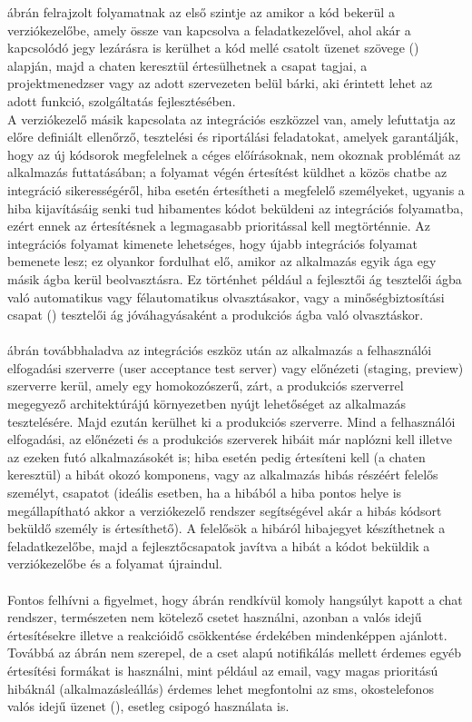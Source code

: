  ábrán felrajzolt folyamatnak az első szintje az amikor a kód bekerül a verziókezelőbe, amely össze van kapcsolva a feladatkezelővel, ahol akár a kapcsolódó jegy lezárásra is kerülhet a kód mellé csatolt üzenet szövege () alapján, majd a chaten keresztül értesülhetnek a csapat tagjai, a projektmenedzser vagy az adott szervezeten belül bárki, aki érintett lehet az adott funkció, szolgáltatás fejlesztésében.\\
A verziókezelő másik kapcsolata az integrációs eszközzel van, amely lefuttatja az előre definiált ellenőrző, tesztelési és riportálási feladatokat, amelyek garantálják, hogy az új kódsorok megfelelnek a céges előírásoknak, nem okoznak problémát az alkalmazás futtatásában; a folyamat végén értesítést küldhet a közös chatbe az integráció sikerességéről, hiba esetén értesítheti a megfelelő személyeket, ugyanis a hiba kijavításáig senki tud hibamentes kódot beküldeni az integrációs folyamatba, ezért ennek az értesítésnek a legmagasabb prioritással kell megtörténnie. Az integrációs folyamat kimenete lehetséges, hogy újabb integrációs folyamat bemenete lesz; ez olyankor fordulhat elő, amikor az alkalmazás egyik ága egy másik ágba kerül beolvasztásra. Ez történhet például a fejlesztői ág tesztelői ágba való automatikus vagy félautomatikus olvasztásakor, vagy a minőségbiztosítási csapat () tesztelői ág jóváhagyásaként a produkciós ágba való olvasztáskor.\\
\hfill\\
 ábrán továbbhaladva az integrációs eszköz után az alkalmazás a felhasználói elfogadási szerverre (user acceptance test server) vagy előnézeti (staging, preview) szerverre kerül, amely egy homokozószerű, zárt, a produkciós szerverrel megegyező architektúrájú környezetben nyújt lehetőséget az alkalmazás tesztelésére. Majd ezután kerülhet ki a produkciós szerverre. Mind a felhasználói elfogadási, az előnézeti és a produkciós szerverek hibáit már naplózni kell illetve az ezeken futó alkalmazásokét is; hiba esetén pedig értesíteni kell (a chaten keresztül) a hibát okozó komponens, vagy az alkalmazás hibás részéért felelős személyt, csapatot (ideális esetben, ha a hibából a hiba pontos helye is megállapítható akkor a verziókezelő rendszer segítségével akár a hibás kódsort beküldő személy is értesíthető). A felelősök a hibáról hibajegyet készíthetnek a feladatkezelőbe, majd a fejlesztőcsapatok javítva a hibát a kódot beküldik a verziókezelőbe és a folyamat újraindul.\\
\hfill\\
Fontos felhívni a figyelmet, hogy  ábrán rendkívül komoly hangsúlyt kapott a chat rendszer, természeten nem kötelező csetet használni, azonban a valós idejű értesítésekre illetve a reakcióidő csökkentése érdekében mindenképpen ajánlott. Továbbá az ábrán nem szerepel, de a cset alapú notifikálás mellett érdemes egyéb értesítési formákat is használni, mint például az email, vagy magas prioritású hibáknál (alkalmazásleállás) érdemes lehet megfontolni az sms, okostelefonos valós idejű üzenet (), esetleg csipogó használata is.

